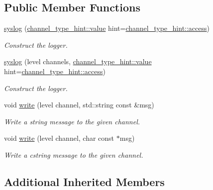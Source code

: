 \subsection*{Public Member Functions}
\begin{DoxyCompactItemize}
\item 
\hyperlink{classwebsocketpp_1_1log_1_1syslog_ab43c642587ea5628c25407341b0e5b11}{syslog} (\hyperlink{structwebsocketpp_1_1log_1_1channel__type__hint_ad12a7f6555b71aabdc4cbec604dc89dd}{channel\+\_\+type\+\_\+hint\+::value} hint=\hyperlink{structwebsocketpp_1_1log_1_1channel__type__hint_a8c38587fffbffbfcfc35577734b0d653}{channel\+\_\+type\+\_\+hint\+::access})
\begin{DoxyCompactList}\small\item\em Construct the logger. \end{DoxyCompactList}\item 
\hyperlink{classwebsocketpp_1_1log_1_1syslog_a28c4016aa44ca9d6415c36c2bc85bf30}{syslog} (level channels, \hyperlink{structwebsocketpp_1_1log_1_1channel__type__hint_ad12a7f6555b71aabdc4cbec604dc89dd}{channel\+\_\+type\+\_\+hint\+::value} hint=\hyperlink{structwebsocketpp_1_1log_1_1channel__type__hint_a8c38587fffbffbfcfc35577734b0d653}{channel\+\_\+type\+\_\+hint\+::access})
\begin{DoxyCompactList}\small\item\em Construct the logger. \end{DoxyCompactList}\item 
void \hyperlink{classwebsocketpp_1_1log_1_1syslog_a48c3f60a621c9ffd9cebbe0959a29ca6}{write} (level channel, std\+::string const \&msg)
\begin{DoxyCompactList}\small\item\em Write a string message to the given channel. \end{DoxyCompactList}\item 
void \hyperlink{classwebsocketpp_1_1log_1_1syslog_a2fda2d9b4aa71d4b47b7e93359b5b0d9}{write} (level channel, char const $\ast$msg)
\begin{DoxyCompactList}\small\item\em Write a cstring message to the given channel. \end{DoxyCompactList}\end{DoxyCompactItemize}
\subsection*{Additional Inherited Members}


